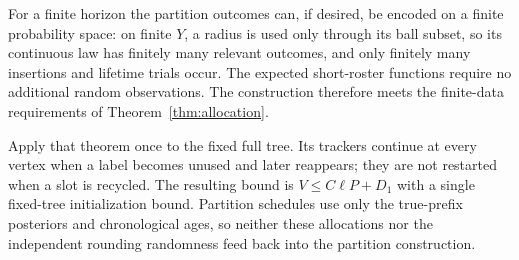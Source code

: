 For a finite horizon the partition outcomes can, if desired, be encoded
on a finite probability space: on finite \(Y\), a radius is used only
through its ball subset, so its continuous law has finitely many relevant
outcomes, and only finitely many insertions and lifetime trials occur.
The expected short-roster functions require no additional random
observations.  The construction therefore meets the finite-data
requirements of Theorem~\ref{thm:allocation}.

Apply that theorem once to the fixed full tree.  Its trackers continue
at every vertex when a label becomes unused and later reappears; they
are not restarted when a slot is recycled.  The resulting bound is
\(V\le C\ell P+D_1\) with a single fixed-tree initialization bound.
Partition schedules use only the true-prefix posteriors and
chronological ages, so neither these allocations nor the independent
rounding randomness feed back into the partition construction.
